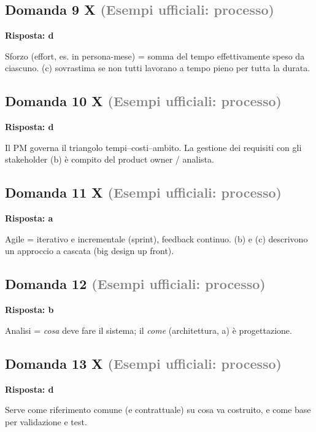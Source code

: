 \documentclass[a4paper,11pt]{article}
\begin{document}
\subsection*{Domanda 9 X \hfill {\small \textcolor{gray}{(Esempi ufficiali: processo)}}}
\textbf{Risposta: d}\par
Sforzo (effort, es. in persona-mese) = somma del tempo effettivamente speso da ciascuno. (c) sovrastima se non tutti lavorano a tempo pieno per tutta la durata.



\subsection*{Domanda 10 X \hfill {\small \textcolor{gray}{(Esempi ufficiali: processo)}}}
\textbf{Risposta: d}\par
Il PM governa il triangolo tempi–costi–ambito. La gestione dei requisiti con gli stakeholder (b) è compito del product owner / analista.



\subsection*{Domanda 11 X \hfill {\small \textcolor{gray}{(Esempi ufficiali: processo)}}}
\textbf{Risposta: a}\par
Agile = iterativo e incrementale (sprint), feedback continuo. (b) e (c) descrivono un approccio a cascata (big design up front).



\subsection*{Domanda 12 \hfill {\small \textcolor{gray}{(Esempi ufficiali: processo)}}}
\textbf{Risposta: b}\par
Analisi = \textit{cosa} deve fare il sistema; il \textit{come} (architettura, a) è progettazione.



\subsection*{Domanda 13 X \hfill {\small \textcolor{gray}{(Esempi ufficiali: processo)}}}
\textbf{Risposta: d}\par
Serve come riferimento comune (e contrattuale) su cosa va costruito, e come base per validazione e test.
\end{document}
